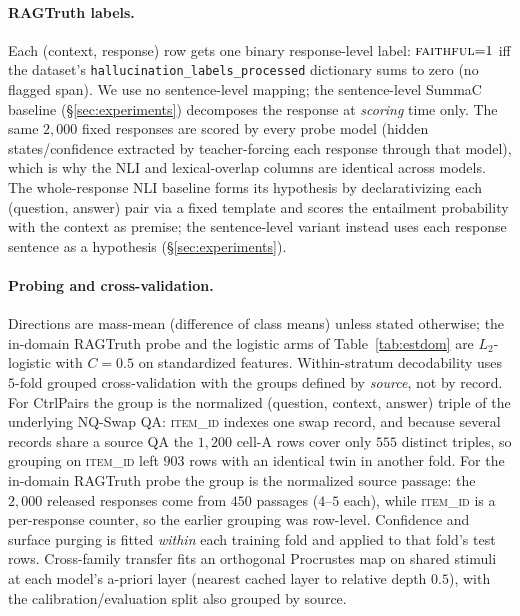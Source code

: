 \paragraph{RAGTruth labels.}
Each (context, response) row gets one binary response-level label:
$\textsc{faithful}{=}1$ iff the dataset's \texttt{hallucination\_labels\_processed}
dictionary sums to zero (no flagged span). We use no sentence-level mapping; the
sentence-level SummaC baseline (\S\ref{sec:experiments}) decomposes the response at
\emph{scoring} time only. The same $2{,}000$ fixed responses are scored by every probe
model (hidden states/confidence extracted by teacher-forcing each response through that
model), which is why the NLI and lexical-overlap columns are identical across models.
The whole-response NLI baseline forms its hypothesis by declarativizing each
(question, answer) pair via a fixed template and scores the entailment probability with
the context as premise; the sentence-level variant instead uses each response sentence
as a hypothesis (\S\ref{sec:experiments}).

\paragraph{Probing and cross-validation.}
Directions are mass-mean (difference of class means) unless stated otherwise; the
in-domain RAGTruth probe and the logistic arms of Table~\ref{tab:estdom} are
$L_2$-logistic with $C{=}0.5$ on standardized features. Within-stratum decodability uses
$5$-fold grouped cross-validation with the groups defined by \emph{source}, not by
record. For CtrlPairs the group is the normalized (question, context, answer) triple of
the underlying NQ-Swap QA: \textsc{item\_id} indexes one swap record, and because
several records share a source QA the $1{,}200$ cell-A rows cover only $555$ distinct
triples, so grouping on \textsc{item\_id} left $903$ rows with an identical twin in
another fold. For the in-domain RAGTruth probe the group is the normalized source
passage: the $2{,}000$ released responses come from $450$ passages ($4$--$5$ each),
while \textsc{item\_id} is a per-response counter, so the earlier grouping was
row-level. Confidence and surface purging is fitted \emph{within} each training fold
and applied to that fold's test rows. Cross-family transfer fits an orthogonal
Procrustes map on shared stimuli at each model's a-priori layer (nearest cached layer
to relative depth $0.5$), with the calibration/evaluation split also grouped by source.

